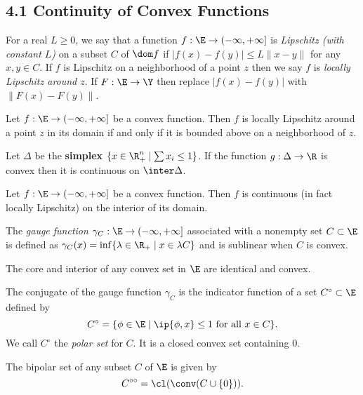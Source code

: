 \documentclass[../borwein-lewis_notes.tex]{subfiles}
\begin{document}
\maketitle
\subsection{4.1 Continuity of Convex Functions}
For a real $L\geq 0$, we say that a function $f:\E\to(-\infty,+\infty]$ 
is \textit{Lipschitz (with constant $L$)} on a subset $C$ of $\dom f$ 
if $|f(x)-f(y)|\leq L\|x-y\|$ for any $x,y\in C$. If $f$ is Lipschitz 
on a neighborhood of a point $z$ then we say $f$ is \textit{locally 
Lipschitz around $z$}. If $F:\E\to\Y$ then replace $|f(x)-f(y)|$ with 
$\|F(x)-F(y)\|$.
\begin{theorem}
\label{4.1.1}
Let $f:\E\to(-\infty,+\infty]$ be a convex function. Then $f$ is 
locally Lipschitz around a point $z$ in its domain if and only if it
is bounded above on a neighborhood of $z$.
\end{theorem}
\begin{lemma}[4.1.2]
Let $\Delta$ be the \textbf{simplex} $\{x\in\R_+^n\mid \sum x_i\leq 1\}$. 
If the function $g:\Delta\to\R$ is convex then it is continuous on 
$\inter\Delta$.
\label{4.1.2}
\end{lemma}
\begin{theorem}
\label{4.1.3} Let $f:\E\to(-\infty,+\infty]$ be a convex function. Then 
$f$ is continuous (in fact locally Lipschitz) on the interior of its 
domain.
\end{theorem}
The \textit{gauge function} $\gamma_C:\E\to(-\infty,+\infty]$ associated
with a nonempty set $C\subset\E$ is defined as 
$\gamma_C(x) = \inf\{\lambda\in\R_+\mid x\in\lambda C\}$ and is sublinear
when $C$ is convex.
\begin{theorem}
\label{4.1.4}
The core and interior of any convex set in $\E$ are identical and convex.
\end{theorem}
The conjugate of the gauge function $\gamma_C$ is the indicator function
of a set $C^\circ\subset \E$ defined by 
\begin{equation*}
C^\circ = \{\phi\in\E\mid \ip{\phi, x}\leq 1 \text{ for all }x\in C\}.
\end{equation*}
We call $C^\circ$ the \textit{polar set} for $C$. It is a closed convex 
set containing 0.
\begin{theorem}
\label{4.1.5}
The bipolar set of any subset $C$ of $\E$ is given by 
\begin{equation*}
C^{\circ\circ} = \cl(\conv(C\cup\{0\})).
\end{equation*}
\end{theorem}
\end{document}
